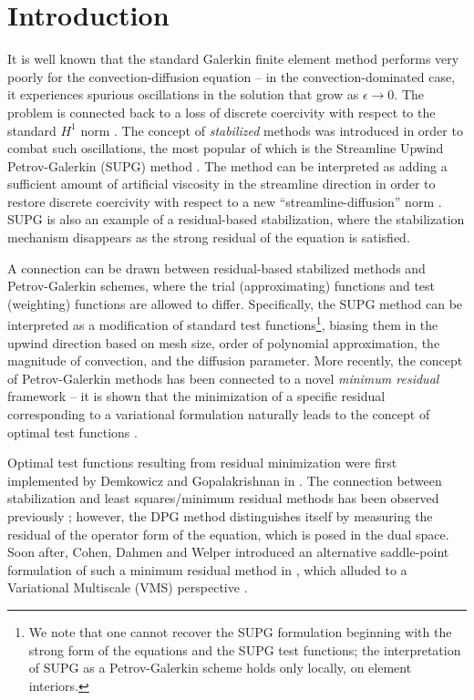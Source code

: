 \section{Introduction}

It is well known that the standard Galerkin finite element method performs very poorly for the convection-diffusion equation -- in the convection-dominated case, it experiences spurious oscillations in the solution that grow as $\epsilon \rightarrow 0$.  The problem is connected back to a loss of discrete coercivity with respect to the standard $H^1$ norm \cite{roos2008robust}.  The concept of \textit{stabilized} methods was introduced in order to combat such oscillations, the most popular of which is the Streamline Upwind Petrov-Galerkin (SUPG) method \cite{SUPG}.  The method can be interpreted as adding a sufficient amount of artificial viscosity in the streamline direction in order to restore discrete coercivity with respect to a new ``streamline-diffusion'' norm \cite{johnsonCrosswind}.  SUPG is also an example of a residual-based stabilization, where the stabilization mechanism disappears as the strong residual of the equation is satisfied.  

A connection can be drawn between residual-based stabilized methods and Petrov-Galerkin schemes, where the trial (approximating) functions and test (weighting) functions are allowed to differ.  Specifically, the SUPG method can be interpreted as a modification of standard test functions\footnote{We note that one cannot recover the SUPG formulation beginning with the strong form of the equations and the SUPG test functions; the interpretation of SUPG as a Petrov-Galerkin scheme holds only locally, on element interiors.}, biasing them in the upwind direction based on mesh size, order of polynomial approximation, the magnitude of convection, and the diffusion parameter.  More recently, the concept of Petrov-Galerkin methods has been connected to a novel \textit{minimum residual} framework -- it is shown that the minimization of a specific residual corresponding to a variational formulation naturally leads to the concept of optimal test functions \cite{overviewDPG}.  

Optimal test functions resulting from residual minimization were first implemented by Demkowicz and Gopalakrishnan in \cite{DPG2,DPG1}.  The connection between stabilization and least squares/minimum residual methods has been observed previously \cite{GLS}; however, the DPG method distinguishes itself by measuring the residual of the operator form of the equation, which is posed in the dual space.  Soon after, Cohen, Dahmen and Welper introduced an alternative saddle-point formulation of such a minimum residual method in \cite{DahmenVariationalStabilization}, which alluded to a Variational Multiscale (VMS) perspective \cite{VMS1,VMS2,HughesVMS}.  


